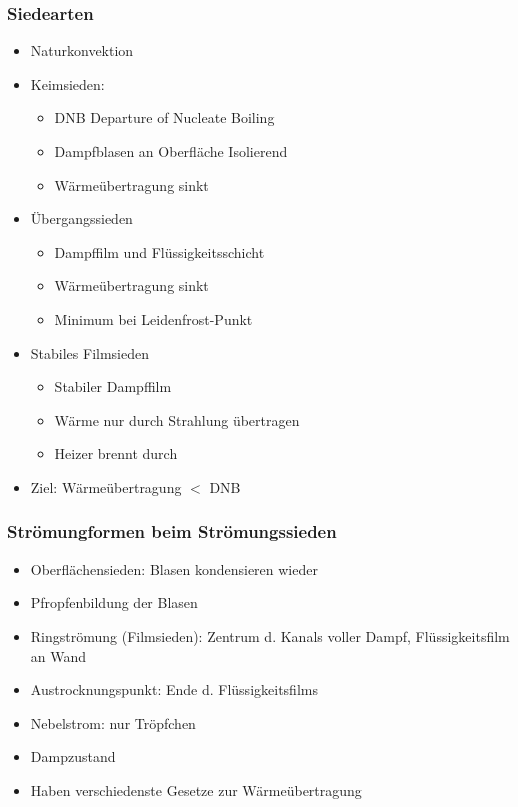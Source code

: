 \documentclass[12pt]{article}
\begin{document}
\subsubsection{Siedearten}
\begin{itemize}
	\item Naturkonvektion
	\item Keimsieden:
		\begin{itemize}
			\item DNB \textrightarrow Departure of Nucleate Boiling
			\item Dampfblasen an Oberfläche \textrightarrow Isolierend
			\item Wärmeübertragung sinkt
		\end{itemize}
	\item Übergangssieden
		\begin{itemize}
			\item Dampffilm und Flüssigkeitsschicht
			\item Wärmeübertragung sinkt
			\item Minimum bei Leidenfrost-Punkt
		\end{itemize}
	\item Stabiles Filmsieden
		\begin{itemize}
			\item Stabiler Dampffilm
			\item Wärme nur durch Strahlung übertragen
			\item Heizer brennt durch
		\end{itemize}
	\item Ziel: Wärmeübertragung \(<\) DNB
\end{itemize}

\subsubsection{Strömungformen beim Strömungssieden}
\begin{itemize}
	\item Oberflächensieden: Blasen kondensieren wieder
	\item Pfropfenbildung der Blasen
	\item Ringströmung (Filmsieden): Zentrum d. Kanals voller Dampf, Flüssigkeitsfilm an Wand
	\item Austrocknungspunkt: Ende d. Flüssigkeitsfilms
	\item Nebelstrom: nur Tröpfchen
	\item Dampzustand
	\item Haben verschiedenste Gesetze zur Wärmeübertragung
\end{itemize}
\end{document}
